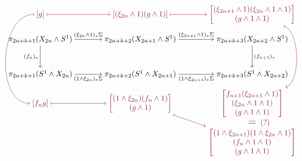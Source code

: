 \begingroup
\everydisplay{\displaywidth=\dimexpr\linewidth+18mm\relax \displayindent=-9mm\relax}
\[
\begin{tikzcd}[cramped,column sep=large,row sep=small]
	{\color{rojoDiagramaCIMAT}[g]}
		\arrow[r,rojoDiagramaCIMAT,maps to]
		\arrow[ddd,rojoDiagramaCIMAT,maps to,out=180,in=180,looseness=1]
	&
	{\color{rojoDiagramaCIMAT}\left[(\xi_{2n}\wedge1) (g\wedge1)\right]}
		\arrow[r,rojoDiagramaCIMAT,maps to]
	&
	{\color{rojoDiagramaCIMAT}\left[
		\begin{gathered}
			(\xi_{2n+1}\wedge1) (\xi_{2n}\wedge1\wedge1)\\[-.3em]
			{} (g\wedge1\wedge1)
		\end{gathered}
	\right]}
		\arrow[ddd,rojoDiagramaCIMAT,maps to,out=-20,in=25,looseness=0.7]
	\\
	\pi_{2n+k+1}(X_{2n}\wedge S^1)
		\arrow[r,"(\xi_{2n}\wedge1)_* \Sigma"]
		\arrow[d,"(f_n)_*"']
	&
	\pi_{2n+k+2}(X_{2n+1}\wedge S^1)
		\arrow[r,"(\xi_{2n+1}\wedge1)_* \Sigma"]
	&
	\pi_{2n+k+3}(X_{2n+2}\wedge S^1)
		\arrow[d,"(f_{n+1})_*"]
	\\[2em]
	\pi_{2n+k+1}(S^1\wedge X_{2n})
		\arrow[r,"(1\wedge\xi_{2n})_* \Sigma"']
	&
	\pi_{2n+k+2}(S^1\wedge X_{2n+1})
		\arrow[r,"(1\wedge\xi_{2n+1})_* \Sigma"']
	&
	\pi_{2n+k+3}(S^1\wedge X_{2n+2})
	\\
	{\color{rojoDiagramaCIMAT}[f_n  g]}
		\arrow[r,rojoDiagramaCIMAT,maps to]
	&
	{\color{rojoDiagramaCIMAT}\left[
		\begin{gathered}
			(1\wedge\xi_{2n}) (f_n\wedge1)\\[-.3em]
			{} (g\wedge1)
		\end{gathered}
	\right]}
		\arrow[dr,rojoDiagramaCIMAT,maps to]
	&
	{\color{rojoDiagramaCIMAT}\left[
		\begin{gathered}
			f_{n+1} (\xi_{2n+1}\wedge1)\\[-.3em]
			{} (\xi_{2n}\wedge1\wedge1)\\[-.3em]
			{} (g\wedge1\wedge1)
		\end{gathered}
	\right]}
        \arrow[d, rojoDiagramaCIMAT, phantom, "="{description, font=\Large}, "\;\;\;(?)"{right}]
	\\
	& &
	{\color{rojoDiagramaCIMAT}\left[
		\begin{gathered}
			(1\wedge\xi_{2n+1}) (1\wedge\xi_{2n}\wedge1)\\[-.3em]
			{} (f_n\wedge1\wedge1)\\[-.3em]
			{} (g\wedge1\wedge1)
		\end{gathered}
	\right]}
\end{tikzcd}
\]
\endgroup